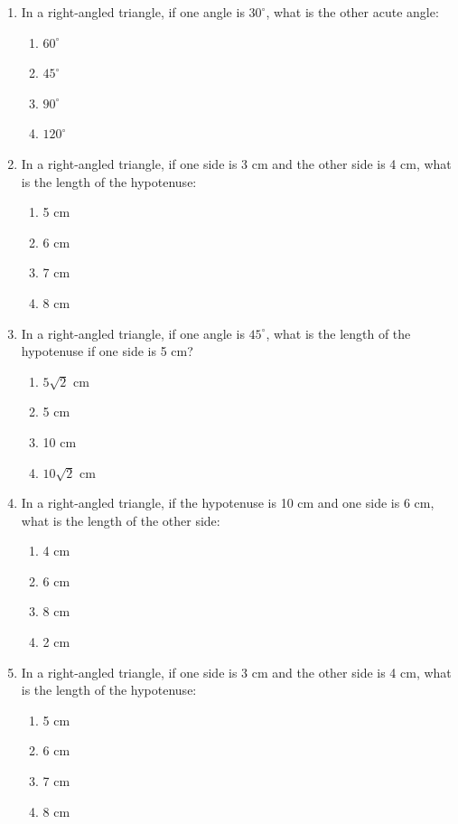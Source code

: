 \documentclass[11pt]{article}
\begin{document}
\begin{enumerate}[label=\textbf{\arabic*.}, start=204, leftmargin=2em]
\item In a right-angled triangle, if one angle is $30^\circ$, what is the other acute angle:
\begin{enumerate}[label=(\Alph*)] \item $60^\circ$ \item $45^\circ$ \item $90^\circ$ \item $120^\circ$ \end{enumerate}

\item In a right-angled triangle, if one side is 3 cm and the other side is 4 cm, what is the length of the hypotenuse:
\begin{enumerate}[label=(\Alph*)] \item 5 cm \item 6 cm \item 7 cm \item 8 cm \end{enumerate}

\item In a right-angled triangle, if one angle is $45^\circ$, what is the length of the hypotenuse if one side is 5 cm?
\begin{enumerate}[label=(\Alph*)] \item $5\sqrt{2}$ cm \item 5 cm \item 10 cm \item $10\sqrt{2}$ cm \end{enumerate}

\item In a right-angled triangle, if the hypotenuse is 10 cm and one side is 6 cm, what is the length of the other side:
\begin{enumerate}[label=(\Alph*)] \item 4 cm \item 6 cm \item 8 cm \item 2 cm \end{enumerate}

\item In a right-angled triangle, if one side is 3 cm and the other side is 4 cm, what is the length of the hypotenuse:
\begin{enumerate}[label=(\Alph*)] \item 5 cm \item 6 cm \item 7 cm \item 8 cm \end{enumerate}


\end{enumerate}
\end{document}
